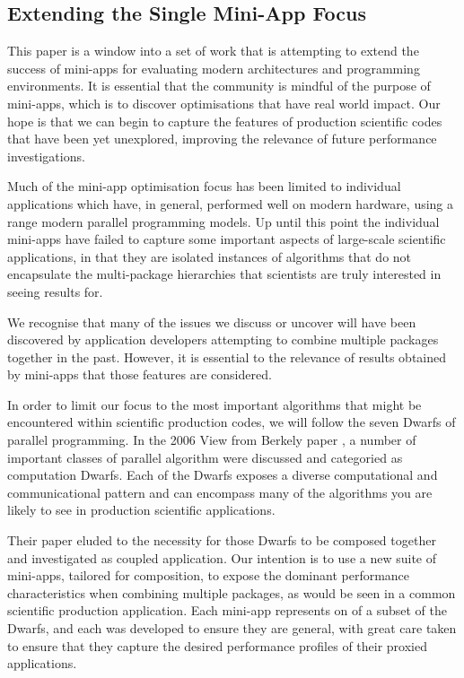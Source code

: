 \documentclass[runningheads,a4paper]{llncs}
\begin{document}
\subsection{Extending the Single Mini-App Focus}

This paper is a window into a set of work that is attempting to extend the success of mini-apps for evaluating modern architectures and programming environments. It is essential that the community is mindful of the purpose of mini-apps, which is to discover optimisations that have real world impact. Our hope is that we can begin to capture the features of production scientific codes that have been yet unexplored, improving the relevance of future performance investigations. 

Much of the mini-app optimisation focus has been limited to individual applications which have, in general, performed well on modern hardware, using a range modern parallel programming models. Up until this point the individual mini-apps have failed to capture some important aspects of large-scale scientific applications, in that they are isolated instances of algorithms that do not encapsulate the multi-package hierarchies that scientists are truly interested in seeing results for.

We recognise that many of the issues we discuss or uncover will have been discovered by application developers attempting to combine multiple packages together in the past. However, it is essential to the relevance of results obtained by mini-apps that those features are considered.

In order to limit our focus to the most important algorithms that might be encountered within scientific production codes, we will follow the seven Dwarfs of parallel programming. In the 2006 View from Berkely paper \cite{Asanovic2006}, a number of important classes of parallel algorithm were discussed and categoried as computation Dwarfs. Each of the Dwarfs exposes a diverse computational and communicational pattern and can encompass many of the algorithms you are likely to see in production scientific applications.  

Their paper eluded to the necessity for those Dwarfs to be composed together and investigated as coupled application. Our intention is to use a new suite of mini-apps, tailored for composition, to expose the dominant performance characteristics when combining multiple packages, as would be seen in a common scientific production application. Each mini-app represents on of a subset of the Dwarfs, and each was developed to ensure they are general, with great care taken to ensure that they capture the desired performance profiles of their proxied applications.
\end{document}
